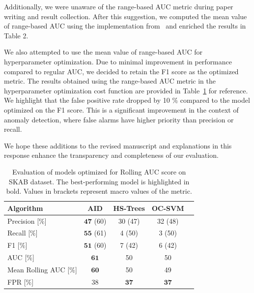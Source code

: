 \documentclass{article}
\begin{document}
\begin{enumerate}
        Additionally, we were unaware of the range-based AUC metric during paper writing and result collection. After this suggestion, we computed the mean value of range-based AUC using the implementation from~\cite{Brzezinski2017} and enriched the results in Table 2.

        We also attempted to use the mean value of range-based AUC for hyperparameter optimization. Due to minimal improvement in performance compared to regular AUC, we decided to retain the F1 score as the optimized metric. The results obtained using the range-based AUC metric in the hyperparameter optimization cost function are provided in Table~\ref{tab:perf_comp_rollauc} for reference. We highlight that the false positive rate dropped by 10 \% compared to the model optimized on the F1 score. This is a significant improvement in the context of anomaly detection, where false alarms have higher priority than precision or recall.

        We hope these additions to the revised manuscript and explanations in this response enhance the transparency and completeness of our evaluation.

\end{enumerate}


\begin{table}[htbp]
  \caption{Evaluation of models optimized for Rolling AUC score on SKAB dataset. The best-performing model is highlighted in bold. Values in brackets represent macro values of the metric.}
  \begin{center}
    \label{tab:perf_comp_rollauc}
    \begin{tabular}{|l|c|c|c|c|}
      \hline
      \textbf{Algorithm}      & AID                    & HS-Trees          & OC-SVM            \\
      \hline
      Precision [$\%$]        & $\boldsymbol{47}$ (60) & 30 (47)           & 32 (48)           \\
      \hline
      Recall [$\%$]           & $\boldsymbol{55}$ (61) & 4 (50)            & 3 (50)            \\
      \hline
      F1 [$\%$]               & $\boldsymbol{51}$ (60) & 7 (42)            & 6 (42)            \\
      \hline
      AUC [$\%$]              & $\boldsymbol{61}$      & 50                & 50                \\
      \hline
      Mean Rolling AUC [$\%$] & $\boldsymbol{60}$      & 50                & 49                \\
      \hline
      FPR [$\%$]              & 38                     & $\boldsymbol{37}$ & $\boldsymbol{37}$ \\
      \hline
    \end{tabular}
  \end{center}
\end{table}
\end{document}

